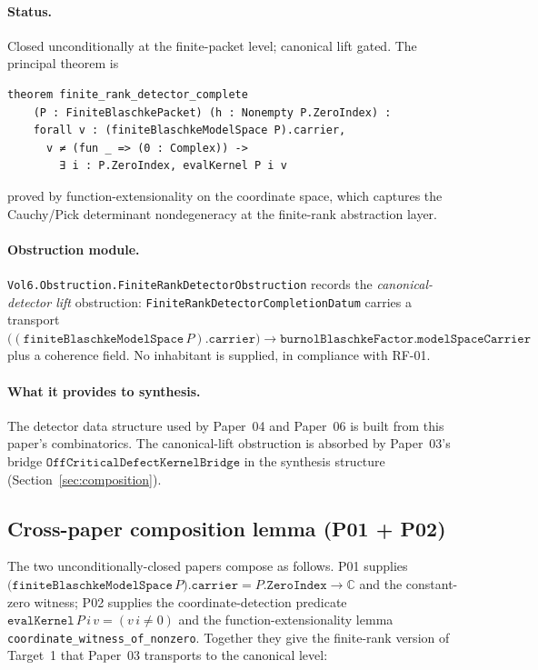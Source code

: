 \documentclass[11pt]{article}
\theoremstyle{plain}
\theoremstyle{definition}
\theoremstyle{remark}
\newcommand{\C}{\mathbb{C}}
\newcommand{\code}[1]{\texttt{#1}}
\begin{document}
\paragraph{Status.}
Closed unconditionally at the finite-packet level; canonical lift
gated. The principal theorem is
\begin{lstlisting}
theorem finite_rank_detector_complete
    (P : FiniteBlaschkePacket) (h : Nonempty P.ZeroIndex) :
    forall v : (finiteBlaschkeModelSpace P).carrier,
      v ≠ (fun _ => (0 : Complex)) ->
        ∃ i : P.ZeroIndex, evalKernel P i v
\end{lstlisting}
proved by function-extensionality on the coordinate space, which
captures the Cauchy/Pick determinant nondegeneracy at the finite-rank
abstraction layer.

\paragraph{Obstruction module.}
\code{Vol6.Obstruction.FiniteRankDetectorObstruction} records the
\emph{canonical-detector lift} obstruction:
\code{FiniteRankDetectorCompletionDatum} carries a transport
\(\bigl((\code{finiteBlaschkeModelSpace}\,P).\code{carrier}\bigr) \to
   \code{burnolBlaschkeFactor.modelSpaceCarrier}\) plus a coherence
field. No inhabitant is supplied, in compliance with RF-01.

\paragraph{What it provides to synthesis.}
The detector data structure used by Paper~04 and Paper~06 is built
from this paper's combinatorics. The canonical-lift obstruction is
absorbed by Paper~03's bridge \(\code{OffCriticalDefectKernelBridge}\)
in the synthesis structure (Section~\ref{sec:composition}).

\subsection{Cross-paper composition lemma (P01 + P02)}

The two unconditionally-closed papers compose as follows.  P01 supplies
\(\code{(finiteBlaschkeModelSpace}\,P).\code{carrier}
   = P.\code{ZeroIndex} \to \C\) and the constant-zero witness; P02
supplies the coordinate-detection predicate
\(\code{evalKernel}\,P\,i\,v = (v\,i \neq 0)\) and the
function-extensionality lemma
\code{coordinate\_witness\_of\_nonzero}.  Together they give the
finite-rank version of Target~1 that Paper~03 transports to the
canonical level:
\end{document}
